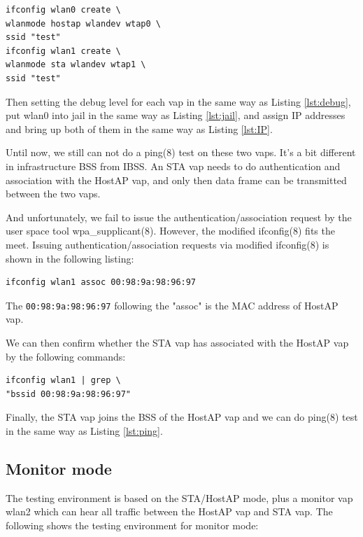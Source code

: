 \documentclass[conference]{IEEEtran}
\begin{document}
\begin{lstlisting}
ifconfig wlan0 create \
wlanmode hostap wlandev wtap0 \
ssid "test"
ifconfig wlan1 create \
wlanmode sta wlandev wtap1 \
ssid "test"
\end{lstlisting}

Then setting the debug level for each vap in the same way as Listing \ref{lst:debug}, put wlan0 into jail in the same way as Listing \ref{lst:jail}, and assign IP addresses and bring up both of them in the same way as Listing \ref{lst:IP}.

Until now, we still can not do a ping(8) test on these two vaps. It's a bit different in infrastructure BSS from IBSS. An STA vap needs to do authentication and association with the HostAP vap, and only then data frame can be transmitted between the two vaps. 

And unfortunately, we fail to issue the authentication/association request by the user space tool wpa\_supplicant(8). However, the modified ifconfig(8) \cite{commit:mlme} fits the meet. Issuing authentication/association requests via modified ifconfig(8) is shown in the following listing:

\begin{lstlisting}
ifconfig wlan1 assoc 00:98:9a:98:96:97
\end{lstlisting}

The \lstinline{00:98:9a:98:96:97} following the "assoc" is the MAC address of HostAP vap.

We can then confirm whether the STA vap has associated with the HostAP vap by the following commands:

\begin{lstlisting}
ifconfig wlan1 | grep \
"bssid 00:98:9a:98:96:97"
\end{lstlisting}

Finally, the STA vap joins the BSS of the HostAP vap and we can do ping(8) test in the same way as Listing \ref{lst:ping}.

\subsection{Monitor mode}
The testing environment is based on the STA/HostAP mode, plus a monitor vap wlan2 which can hear all traffic between the HostAP vap and STA vap. The following shows the testing environment for monitor mode:
\end{document}
